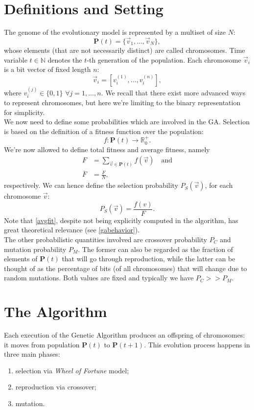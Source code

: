 \documentclass[%
    corpo=11pt,
    twoside,
    stile=classica,
    oldstyle,
    autoretitolo,
    tipotesi=magistrale,
    greek,
    evenboxes,
    english
]{toptesi}
\begin{document}
\section{Definitions and Setting}
The genome of the evolutionary model is represented by a multiset of size $N$:
\begin{equation}
\textbf{P}(t) = \{\vec{v}_1, \dots, \vec{v}_N \},
\end{equation}
whose elements (that are not necessarily distinct) are called chromosomes. Time variable $t\in \mathbb{N}$ denotes the $t$-th generation of the population. Each chromosome $\vec{v}_i$ is a bit vector of fixed length $n$:
\begin{equation}
\vec{v}_i = \left[v_i^{(1)}, \dots, v_i^{(n)} \right],
\end{equation}
where $v_i^{(j)} \in \{0,1\}$ $\forall j = 1, \dots, n$. We recall that there exist more advanced ways to represent chromosomes, but here we're limiting to the binary representation for simplicity. \\
We now need to define some probabilities which are involved in the GA. Selection is based on the definition of a fitness function over the population:
\begin{equation}
f: \textbf{P}(t) \longrightarrow \mathbb{R}_0^{+}.
\end{equation}
We're now allowed to define total fitness and average fitness, namely
\begin{align}
F &= \sum_{\vec{v}\in \textbf{P}(t)}f(\vec{v}) \quad \text{and} \\
\overline{F} &= \frac{F}{N}, \label{avgfit}
\end{align}
respectively. We can hence define the selection probability $P_S(\vec{v})$, for each chromosome $\vec{v}$:
\begin{equation}
P_S(\vec{v}) = \frac{f(v)}{F}.
\end{equation}
Note that \ref{avgfit}, despite not being explicitly computed in the algorithm, has great theoretical relevance (see \ref{gabehavior}). \\
The other probabilistic quantities involved are crossover probability $P_C$ and mutation probability $P_M$. The former can also be regarded as the fraction of elements of $\textbf{P}(t)$ that will go through reproduction, while the latter can be thought of as the percentage of bits (of all chromosomes) that will change due to random mutations. Both values are fixed and typically we have $P_C >> P_M$.

\section{The Algorithm}
Each execution of the Genetic Algorithm produces an offspring of chromosomes: it moves from  population $\textbf{P}(t)$ to $\textbf{P}(t+1)$. This evolution process happens in three main phases:
\begin{enumerate}
\item selection via \textit{Wheel of Fortune} model;
\item reproduction via crossover;
\item mutation.
\end{enumerate}
\end{document}
